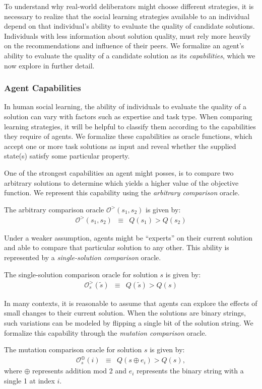 To understand why real-world deliberators might choose different strategies,
it is necessary to realize that the social learning strategies available to an
individual depend on that individual's ability to evaluate the quality of candidate solutions.
Individuals with less information about solution quality, must rely
more heavily on the recommendations and influence of their peers.
We formalize an agent's ability to evaluate the quality of a candidate solution
as its {\em capabilities}, which we now explore in further detail.

\subsubsection{Agent Capabilities}
\label{sec:capability}
In human social learning, the ability of individuals to evaluate the quality of a solution can vary with factors such as expertise and task type. When comparing learning strategies, it will be helpful to classify them according to the capabilities they require of agents. We formalize these capabilities as oracle functions, which accept one or more task solutions as input and reveal whether the supplied state(s) satisfy some particular property.

One of the strongest capabilities an agent might posses, is to compare two arbitrary solutions to determine which yields a higher value of the objective function. We represent this capability using the {\em arbitrary comparison} oracle.
\begin{definition}
The arbitrary comparison oracle $\mathcal{O^>}(s_1, s_2)$ is given by:
\begin{eqnarray}
\mathcal{O}^>(s_1, s_2) &\equiv&
Q(s_1) > Q(s_2)
\end{eqnarray}
\end{definition}

Under a weaker assumption, agents might be ``experts'' on their current solution and able to compare that particular solution to any other. This ability is represented by a {\em single-solution comparison} oracle.
\begin{definition}
The single-solution comparison oracle for solution $s$ is given by:
\begin{eqnarray}
\mathcal{O}^>_s(\tilde{s}) &\equiv&
Q(\tilde{s}) > Q(s)
\end{eqnarray}
\end{definition}

In many contexts, it is reasonable to assume that agents can explore the effects of small changes to their current solution. When the solutions are binary strings, such variations can be modeled by flipping a single bit of the solution string. We formalize this capability through the {\em mutation comparison} oracle.
\begin{definition}
The mutation comparison oracle for solution $s$ is given by:
\begin{eqnarray}
\mathcal{O}^\oplus_s(i) &\equiv&
Q(s \oplus e_i) > Q(s),
\end{eqnarray}
where $\oplus$ represents addition mod 2 and $e_i$ represents the binary string with a single 1 at index $i$.
\end{definition}

